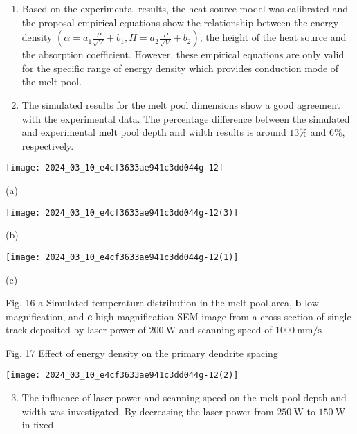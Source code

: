\documentclass[10pt]{article}
\begin{document}
\begin{enumerate}
  \item Based on the experimental results, the heat source model was calibrated and the proposal empirical equations show the relationship between the energy density $\left(\alpha=a_{1} \frac{P}{\sqrt{V}}+b_{1}, H=a_{2} \frac{P}{\sqrt{V}}+b_{2}\right)$, the height of the heat source and the absorption coefficient. However, these empirical equations are only valid for the specific range of energy density which provides conduction mode of the melt pool.

  \item The simulated results for the melt pool dimensions show a good agreement with the experimental data. The percentage difference between the simulated and experimental melt pool depth and width results is around $13 \%$ and $6 \%$, respectively.

\end{enumerate}

\begin{center}
\texttt{[image: 2024\_03\_10\_e4cf3633ae941c3dd044g-12]}
\end{center}

(a)

\begin{center}
\texttt{[image: 2024\_03\_10\_e4cf3633ae941c3dd044g-12(3)]}
\end{center}

(b)

\begin{center}
\texttt{[image: 2024\_03\_10\_e4cf3633ae941c3dd044g-12(1)]}
\end{center}

(c)

Fig. 16 a Simulated temperature distribution in the melt pool area, $\mathbf{b}$ low magnification, and $\mathbf{c}$ high magnification SEM image from a cross-section of single track deposited by laser power of $200 \mathrm{~W}$ and scanning speed of $1000 \mathrm{~mm} / \mathrm{s}$

Fig. 17 Effect of energy density on the primary dendrite spacing

\begin{center}
\texttt{[image: 2024\_03\_10\_e4cf3633ae941c3dd044g-12(2)]}
\end{center}

\begin{enumerate}
  \setcounter{enumi}{2}
  \item The influence of laser power and scanning speed on the melt pool depth and width was investigated. By decreasing the laser power from $250 \mathrm{~W}$ to $150 \mathrm{~W}$ in fixed
\end{enumerate}
\end{document}
